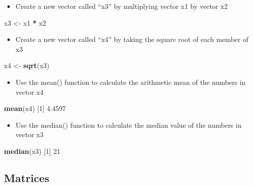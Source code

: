 \documentclass[
]{book}
\newenvironment{Shaded}{\begin{snugshade}}{\end{snugshade}}
\newcommand{\DecValTok}[1]{\textcolor[rgb]{0.00,0.00,0.81}{#1}}
\newcommand{\FloatTok}[1]{\textcolor[rgb]{0.00,0.00,0.81}{#1}}
\newcommand{\KeywordTok}[1]{\textcolor[rgb]{0.13,0.29,0.53}{\textbf{#1}}}
\newcommand{\NormalTok}[1]{#1}
\newcommand{\OperatorTok}[1]{\textcolor[rgb]{0.81,0.36,0.00}{\textbf{#1}}}
\newcommand{\StringTok}[1]{\textcolor[rgb]{0.31,0.60,0.02}{#1}}
\providecommand{\tightlist}{%
  \setlength{\itemsep}{0pt}\setlength{\parskip}{0pt}}
\begin{document}
\begin{itemize}
\tightlist
\item
  Create a new vector called ``x3'' by multiplying vector x1 by vector x2
\end{itemize}

\begin{Shaded}
\begin{Highlighting}[]
\NormalTok{x3 <-}\StringTok{ }\NormalTok{x1 }\OperatorTok{*}\StringTok{ }\NormalTok{x2}
\end{Highlighting}
\end{Shaded}

\begin{itemize}
\tightlist
\item
  Create a new vector called ``x4'' by taking the square root of each member of x3
\end{itemize}

\begin{Shaded}
\begin{Highlighting}[]
\NormalTok{x4 <-}\StringTok{ }\KeywordTok{sqrt}\NormalTok{(x3)}
\end{Highlighting}
\end{Shaded}

\begin{itemize}
\tightlist
\item
  Use the mean() function to calculate the arithmetic mean of the numbers in vector x4
\end{itemize}

\begin{Shaded}
\begin{Highlighting}[]
\KeywordTok{mean}\NormalTok{(x4)}
\NormalTok{[}\DecValTok{1}\NormalTok{] }\FloatTok{4.4597}
\end{Highlighting}
\end{Shaded}

\begin{itemize}
\tightlist
\item
  Use the median() function to calculate the median value of the numbers in vector x3
\end{itemize}

\begin{Shaded}
\begin{Highlighting}[]
\KeywordTok{median}\NormalTok{(x3)}
\NormalTok{[}\DecValTok{1}\NormalTok{] }\DecValTok{21}
\end{Highlighting}
\end{Shaded}

\hypertarget{matrices-2}{%
\subsection{Matrices}\label{matrices-2}}
\end{document}
